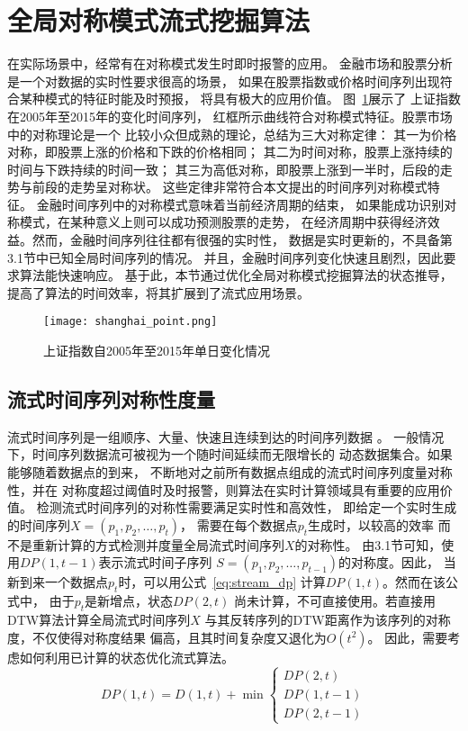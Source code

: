 \section{全局对称模式流式挖掘算法}
在实际场景中，经常有在对称模式发生时即时报警的应用\cite{2022968}。
金融市场和股票分析是一个对数据的实时性要求很高的场景，
如果在股票指数或价格时间序列出现符合某种模式的特征时能及时预报，
将具有极大的应用价值\cite{DBLP:journals/jucs/BeheraDRMD20}。
图~\ref{fig:shanghai_point}展示了
上证指数在2005年至2015年的变化时间序列，
红框所示曲线符合对称模式特征。股票市场中的对称理论是一个
比较小众但成熟的理论，总结为三大对称定律：
其一为价格对称，即股票上涨的价格和下跌的价格相同；
其二为时间对称，股票上涨持续的时间与下跌持续的时间一致；
其三为高低对称，即股票上涨到一半时，后段的走势与前段的走势呈对称状。
这些定律非常符合本文提出的时间序列对称模式特征。
金融时间序列中的对称模式意味着当前经济周期的结束，
如果能成功识别对称模式，在某种意义上则可以成功预测股票的走势，
在经济周期中获得经济效益。然而，金融时间序列往往都有很强的实时性，
数据是实时更新的，不具备第3.1节中已知全局时间序列的情况。
并且，金融时间序列变化快速且剧烈，因此要求算法能快速响应。
基于此，本节通过优化全局对称模式挖掘算法的状态推导，
提高了算法的时间效率，将其扩展到了流式应用场景。
\begin{figure}
  \centering
  \texttt{[image: shanghai\_point.png]}
  \caption{上证指数自2005年至2015年单日变化情况}
  \label{fig:shanghai_point}
\end{figure}

\subsection{流式时间序列对称性度量}
流式时间序列是一组顺序、大量、快速且连续到达的时间序列数据
\cite{DBLP:conf/apweb/KangWWDW18}。
一般情况下，时间序列数据流可被视为一个随时间延续而无限增长的
动态数据集合。如果能够随着数据点的到来，
不断地对之前所有数据点组成的流式时间序列度量对称性，并在
对称度超过阈值时及时报警，则算法在实时计算领域具有重要的应用价值。
检测流式时间序列的对称性需要满足实时性和高效性，
即给定一个实时生成的时间序列$X=(p_1,p_2,\dots,p_t)$，
需要在每个数据点$p_t$生成时，以较高的效率
而不是重新计算的方式检测并度量全局流式时间序列$X$的对称性。
由3.1节可知，使用$DP\left(1,t-1\right)$表示流式时间子序列
$S=(p_1,p_2,\dots,p_{t-1} )$的对称度。因此，
当新到来一个数据点$p_{t}$时，可以用公式~\ref{eq:stream_dp}
计算$DP\left(1,t\right)$。然而在该公式中，
由于$p_{t}$是新增点，状态$DP\left(2,t\right)$
尚未计算，不可直接使用。若直接用DTW算法计算全局流式时间序列$X$
与其反转序列的DTW距离作为该序列的对称度，不仅使得对称度结果
偏高，且其时间复杂度又退化为$O\left(t^2\right)$。
因此，需要考虑如何利用已计算的状态优化流式算法。
\begin{equation}
  DP(1, t)=D(1, t)+\min \left\{\begin{array}{c}
    D P(2, t) \\
    D P(1, t-1) \\
    D P(2, t-1)
    \end{array}\right.
  \label{eq:stream_dp}
\end{equation}

